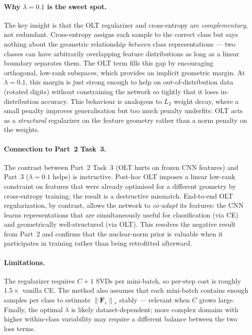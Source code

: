 \documentclass[10pt]{article}
\newcommand{\F}{\mathbf{F}}
\newcommand{\nuc}[1]{\left\|#1\right\|_{\ast}}
\begin{document}
\paragraph{Why $\lambda=0.1$ is the sweet spot.}
The key insight is that the OLT regularizer and cross-entropy are
\emph{complementary}, not redundant. Cross-entropy assigns each sample
to the correct class but says nothing about the geometric relationship
\emph{between} class representations --- two classes can have
arbitrarily overlapping feature distributions as long as a linear
boundary separates them. The OLT term fills this gap by encouraging
orthogonal, low-rank subspaces, which provides an implicit geometric
margin. At $\lambda=0.1$, this margin is just strong enough to help on
out-of-distribution data (rotated digits) without constraining the
network so tightly that it loses in-distribution accuracy. This
behaviour is analogous to $L_2$ weight decay, where a small penalty
improves generalisation but too much penalty underfits: OLT acts as a
\emph{structural} regularizer on the feature geometry rather than a
norm penalty on the weights.

\paragraph{Connection to Part~2 Task~3.}
The contrast between Part~2 Task~3 (OLT hurts on frozen CNN features)
and Part~3 ($\lambda\!=\!0.1$ helps) is instructive. Post-hoc OLT
imposes a linear low-rank constraint on features that were already
optimised for a different geometry by cross-entropy training; the
result is a destructive mismatch. End-to-end OLT regularization, by
contrast, allows the network to \emph{co-adapt} its features: the CNN
learns representations that are simultaneously useful for
classification (via CE) and geometrically well-structured (via OLT).
This resolves the negative result from Part~2 and confirms that the
nuclear-norm prior is valuable when it participates in training rather
than being retrofitted afterward.

\paragraph{Limitations.} The regularizer requires $C+1$ SVDs per
mini-batch, so per-step cost is roughly $1.5\!\times$ vanilla CE.
The method also assumes that each mini-batch contains enough samples
per class to estimate $\nuc{\F_c}$ stably --- relevant when $C$ grows
large. Finally, the optimal $\lambda$ is likely dataset-dependent;
more complex domains with higher within-class variability may require
a different balance between the two loss terms.
\end{document}
